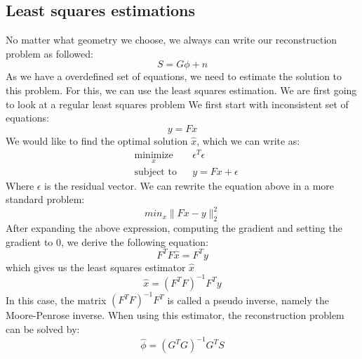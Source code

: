 \documentclass{article}
\begin{document}
\subsection{Least squares estimations}
No matter what geometry we choose, we always can write our reconstruction problem as followed:
$$ S=G\phi +n$$
As we have a overdefined set of equations, we need to estimate the solution to this problem. For this, we can use the least squares estimation. We are first going to look at a regular least squares problem
\newline
\newline
We first start with inconsistent set of equations:
$$ y=Fx $$
We would like to find the optimal solution $\hat{x}$, which we can write as:
\newline
\newline
\begin{equation*}
\begin{aligned}
& \underset{x}{\text{minimize}}
& & \epsilon^T\epsilon \\
& \text{subject to}
& & y=Fx + \epsilon
\end{aligned}
\end{equation*}
\newline
\newline
Where $\epsilon$ is the residual vector. We can rewrite the equation above in a more standard problem:
$$ min_x\|Fx-y\|_2^2$$ 
After expanding the above expression, computing the gradient and setting the gradient to 0, we derive the following equation:
$$ F^TF\hat{x}=F^Ty $$
which gives us the least squares estimator $\hat{x}$
$$ \hat{x} = (F^TF)^{-1}F^Ty $$
In this case, the matrix $(F^TF)^{-1}F^T$ is called a pseudo inverse, namely the Moore-Penrose inverse.
When using this estimator, the reconstruction problem can be solved by:
$$ \hat{\phi} = (G^TG)^{-1}G^TS  $$
\newline
\newline
\end{document}
